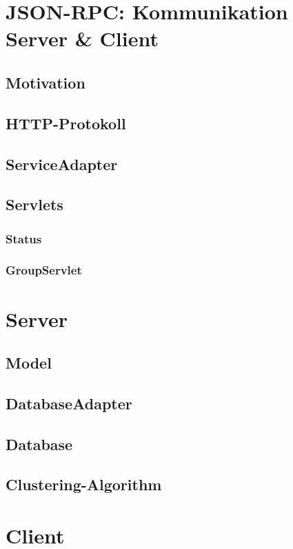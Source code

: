 \documentclass{scrartcl}
\begin{document}
	\section{JSON-RPC: Kommunikation Server \& Client}
	\subsection{Motivation}
	\subsection{HTTP-Protokoll}
	\subsection{ServiceAdapter}
	\subsection{Servlets}
	\subsubsection{Status}
	\subsubsection{GroupServlet}
	\newpage

	\section{Server}
	\subsection{Model}
	\subsection{DatabaseAdapter}
	\subsection{Database}
	\subsection{Clustering-Algorithm}
	\newpage

	\section{Client} 
\end{document}
